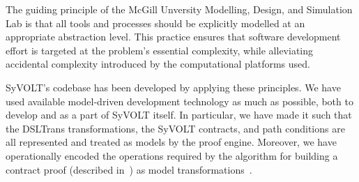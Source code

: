 

The guiding principle of the McGill Unversity Modelling, Design, and Simulation
Lab is that all tools and processes should be explicitly modelled at an
appropriate abstraction level.
This practice ensures that software development effort is targeted at the
problem's essential complexity, while alleviating accidental complexity
introduced by the computational platforms used.


SyVOLT's codebase has been developed by applying these principles. We have used
available model-driven development technology as much as possible, both to
develop and as a part of SyVOLT itself. In particular, we have made it such that
the DSLTrans transformations, the SyVOLT contracts, and path conditions are all represented and treated as models by the proof engine.
 Moreover, we have operationally encoded the
 operations required by the algorithm for building a contract proof (described
 in~\cite{Lucio2014}) as model transformations~\cite{LucioVang}.

